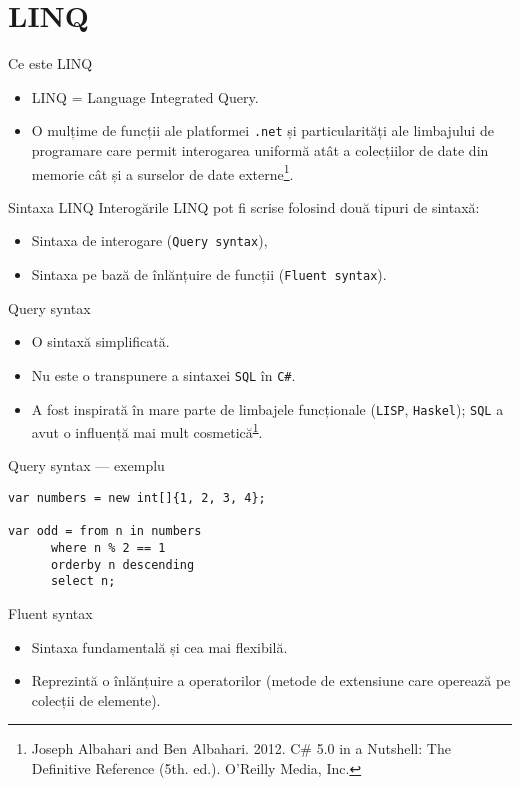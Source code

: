 \documentclass[presentation]{beamer}
\begin{document}
\section{LINQ}
\label{sec:orgc5ed647}
\begin{frame}[label={sec:org22fd0fd},fragile]{Ce este LINQ}
 \begin{itemize}
\item LINQ = Language Integrated Query.
\item O mulțime de funcții ale platformei \texttt{.net} și particularități ale limbajului de programare care permit interogarea uniformă atât a colecțiilor de date din memorie cât și a surselor de date externe\footnote{Joseph Albahari and Ben Albahari. 2012. C\# 5.0 in a Nutshell: The Definitive Reference (5th. ed.). O’Reilly Media, Inc.\label{org03724bb}}.
\end{itemize}
\end{frame}
\begin{frame}[label={sec:org5851f0e},fragile]{Sintaxa LINQ}
 Interogările LINQ pot fi scrise folosind două tipuri de sintaxă:
\begin{itemize}
\item Sintaxa de interogare (\texttt{Query syntax}),
\item Sintaxa pe bază de înlănțuire de funcții (\texttt{Fluent syntax}).
\end{itemize}
\end{frame}
\begin{frame}[label={sec:org1aaba56},fragile]{Query syntax}
 \begin{itemize}
\item O sintaxă simplificată.
\item \alert{Nu} este o transpunere a sintaxei \texttt{SQL} în \texttt{C\#}.
\item A fost inspirată în mare parte de limbajele funcționale (\texttt{LISP}, \texttt{Haskel}); \texttt{SQL} a avut o influență mai mult cosmetică\textsuperscript{\ref{org03724bb}}.
\end{itemize}
\end{frame}
\begin{frame}[label={sec:org16e5b60},fragile]{Query syntax --- exemplu}
 \begin{verbatim}
var numbers = new int[]{1, 2, 3, 4};

var odd = from n in numbers
	  where n % 2 == 1
	  orderby n descending
	  select n;
\end{verbatim}
\end{frame}
\begin{frame}[label={sec:org675d16c}]{Fluent syntax}
\begin{itemize}
\item Sintaxa fundamentală și cea mai flexibilă.
\item Reprezintă o înlănțuire a operatorilor (metode de extensiune care operează pe colecții de elemente).
\end{itemize}
\end{frame}
\end{document}
